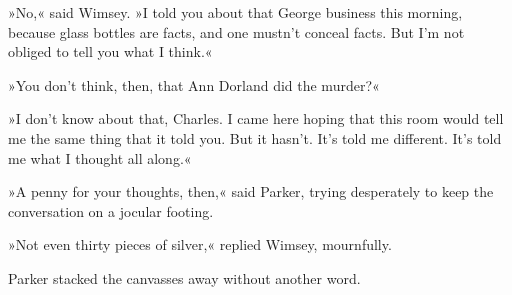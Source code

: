 »No,« said Wimsey. »I told you about that George business this morning, because glass bottles are facts, and one mustn't conceal facts. But I'm not obliged to tell you what I think.«

»You don't think, then, that Ann Dorland did the murder?«

»I don't know about that, Charles. I came here hoping that this room would tell me the same thing that it told you. But it hasn't. It's told me different. It's told me what I thought all along.«

»A penny for your thoughts, then,« said Parker, trying desperately to keep the conversation on a jocular footing.

»Not even thirty pieces of silver,« replied Wimsey, mournfully.

Parker stacked the canvasses away without another word.